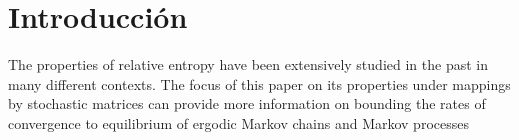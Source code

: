 \section{Introducción}
The properties of relative entropy have been extensively studied in the past in many different contexts. The focus of this paper on its properties under mappings by stochastic matrices can provide more information on bounding the rates of convergence to equilibrium of ergodic Markov chains and Markov processes 
